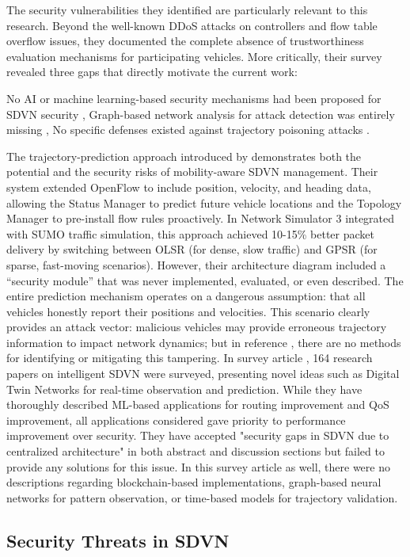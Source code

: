 \documentclass[12pt, a4paper]{report}
\begin{document}
The security vulnerabilities they identified are particularly relevant to this research. Beyond the well-known DDoS attacks on controllers and flow table overflow issues, they documented the complete absence of trustworthiness evaluation mechanisms for participating vehicles. More critically, their survey revealed three gaps that directly motivate the current work:

	 No \acs{AI} or machine learning-based security mechanisms had been proposed for SDVN security \cite{bhatia2019},
	 Graph-based network analysis for attack detection was entirely missing \cite{bhatia2019},
	 No specific defenses existed against trajectory poisoning attacks \cite{bhatia2019}.

The trajectory-prediction approach introduced by \cite{he2016} demonstrates both the potential and the security risks of mobility-aware SDVN management. Their system extended OpenFlow to include position, velocity, and heading data, allowing the Status Manager to predict future vehicle locations and the Topology Manager to pre-install flow rules proactively. In Network Simulator 3 integrated with SUMO traffic simulation, this approach achieved 10-15\% better packet delivery by switching between OLSR (for dense, slow traffic) and GPSR (for sparse, fast-moving scenarios). However, their architecture diagram included a ``security module'' that was never implemented, evaluated, or even described. The entire prediction mechanism operates on a dangerous assumption: that all vehicles honestly report their positions and velocities. This scenario clearly provides an attack vector: malicious vehicles may provide erroneous trajectory information to impact network dynamics; but in reference \cite{he2016}, there are no methods for identifying or mitigating this tampering. In survey article \cite{ravi2023}, 164 research papers on intelligent SDVN were surveyed, presenting novel ideas such as Digital Twin Networks for real-time observation and prediction. While they have thoroughly described ML-based applications for routing improvement and QoS improvement, all applications considered gave priority to performance improvement over security. They have accepted "security gaps in SDVN due to centralized architecture" in both abstract and discussion sections but failed to provide any solutions for this issue. In this survey article as well, there were no descriptions regarding blockchain-based implementations, graph-based neural networks for pattern observation, or time-based models for trajectory validation.
\subsection{Security Threats in SDVN}
\label{subsec:security-threats}
\end{document}
